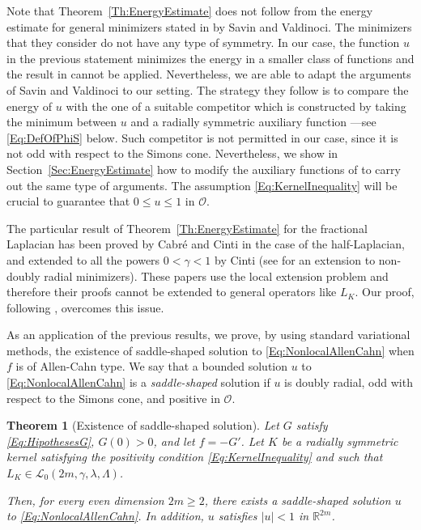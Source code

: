 \documentclass[12pt,reqno]{amsart}
\newtheorem{theorem}{Theorem}[section]
\theoremstyle{definition}
\theoremstyle{remark}
\newcommand{\con}[1]{\mathbb{#1}}
\newcommand{\R}{\con{R}} %
\newcommand{\lcal}{\mathcal{L}}
\newcommand{\ocal}{\mathcal{O}}
\newcommand{\s}{\gamma}
\numberwithin{equation}{section}
\begin{document}
Note that Theorem~\ref{Th:EnergyEstimate} does not follow from the energy estimate for general minimizers stated in \cite{SavinValdinoci-EnergyEstimate} by Savin and Valdinoci. The minimizers that they consider do not have any type of symmetry. In our case, the function $u$ in the previous statement minimizes the energy in a smaller class of functions and the result in \cite{SavinValdinoci-EnergyEstimate} cannot be applied. Nevertheless, we are able to adapt the arguments of Savin and Valdinoci to our setting.  The strategy they follow is to compare the energy of $u$ with the one of a suitable competitor which is constructed by taking the minimum between $u$ and a radially symmetric auxiliary function ---see \eqref{Eq:DefOfPhiS} below. Such competitor is not permitted in our case, since it is not odd with respect to the Simons cone. Nevertheless, we show in Section~\ref{Sec:EnergyEstimate} how to modify the auxiliary functions of \cite{SavinValdinoci-EnergyEstimate} to carry out the same type of arguments. The assumption \eqref{Eq:KernelInequality} will be crucial to guarantee that $0\leq u \leq 1$ in $\ocal$.

The particular result of Theorem~\ref{Th:EnergyEstimate} for the fractional Laplacian has been proved by Cabré and Cinti \cite{CabreCinti-EnergyHalfL} in the case of the half-Laplacian, and extended to all the powers $0<\s<1$ by Cinti \cite{Cinti-Saddle2} (see \cite{CabreCinti-SharpEnergy} for an extension to non-doubly radial minimizers). These papers use the local extension problem and therefore their proofs cannot be extended to general operators like $L_K$. Our proof, following \cite{SavinValdinoci-EnergyEstimate}, overcomes this issue.


As an application of the previous results, we prove, by using standard variational methods, the existence of saddle-shaped solution to \eqref{Eq:NonlocalAllenCahn} when $f$ is of Allen-Cahn type. We say that a bounded solution $u$ to \eqref{Eq:NonlocalAllenCahn} is a \emph{saddle-shaped} solution if $u$ is doubly radial, odd with respect to the Simons cone, and positive in $\ocal$. 

\begin{theorem}[Existence of saddle-shaped solution]
	\label{Th:Existence}
	Let $G$ satisfy \eqref{Eq:HipothesesG}, $G(0)>0$, and let $f=-G'$. Let $K$ be a radially symmetric kernel satisfying the positivity condition \eqref{Eq:KernelInequality} and such that $L_K\in \lcal_0(2m, \s, \lambda, \Lambda)$. 
	
	Then, for every even dimension $2m \geq 2$, there exists a saddle-shaped solution $u$ to \eqref{Eq:NonlocalAllenCahn}. In addition, $u$ satisfies $|u|<1$ in $\R^{2m}$.
\end{theorem}
\end{document}
